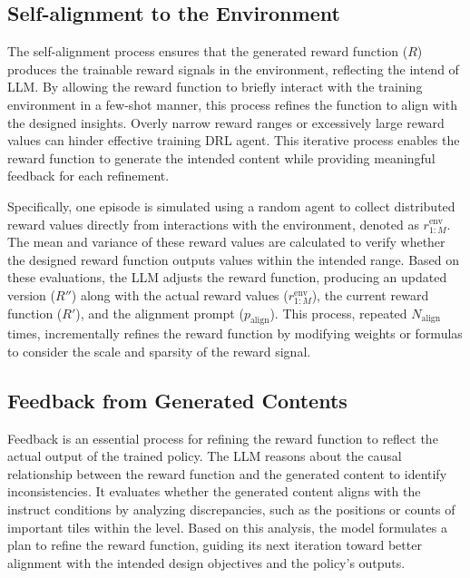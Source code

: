 \subsection{Self-alignment to the Environment}
\label{sec:self_alignment}
The self-alignment process ensures that the generated reward function (\( R \)) produces the trainable reward signals in the environment, reflecting the intend of LLM.
By allowing the reward function to briefly interact with the training environment in a few-shot manner, this process refines the function to align with the designed insights.
Overly narrow reward ranges or excessively large reward values can hinder effective training DRL agent.
This iterative process enables the reward function to generate the intended content while providing meaningful feedback for each refinement.

Specifically, one episode is simulated using a random agent to collect distributed reward values directly from interactions with the environment, denoted as \( r^{\text{env}}_{1:M} \). The mean and variance of these reward values are calculated to verify whether the designed reward function outputs values within the intended range. Based on these evaluations, the LLM adjusts the reward function, producing an updated version (\( R'' \)) along with the actual reward values (\( r^{\text{env}}_{1:M} \)), the current reward function (\( R' \)), and the alignment prompt (\( p_{\text{align}} \)). This process, repeated \( N_{\text{align}} \) times, incrementally refines the reward function by modifying weights or formulas to consider the scale and sparsity of the reward signal.


\subsection{Feedback from Generated Contents}
\label{sec:self_feedback}

Feedback is an essential process for refining the reward function to reflect the actual output of the trained policy. The LLM reasons about the causal relationship between the reward function and the generated content to identify inconsistencies. It evaluates whether the generated content aligns with the instruct conditions by analyzing discrepancies, such as the positions or counts of important tiles within the level. Based on this analysis, the model formulates a plan to refine the reward function, guiding its next iteration toward better alignment with the intended design objectives and the policy's outputs.

